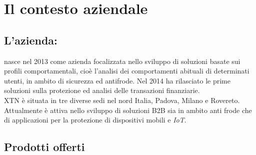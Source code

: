 
\chapter{Il contesto aziendale}
\label{cap:processi-metodologie}

\section{L'azienda: \textbf{\azienda}}
\textbf{\azienda} nasce nel 2013 come azienda focalizzata nello sviluppo di soluzioni basate sui profili comportamentali, cioè l'analisi dei comportamenti abituali di determinati utenti, in ambito di sicurezza ed antifrode. Nel 2014 ha rilasciato le prime soluzioni sulla protezione ed analisi delle transazioni finanziarie.\\
XTN è situata in tre diverse sedi nel nord Italia, Padova, Milano e Rovereto. Attualmente è attiva  nello sviluppo di soluzioni \gls{B2B} sia in ambito anti frode che di applicazioni per la protezione di dispositivi mobili e \textit{IoT}.\\
  
\section{Prodotti offerti}

